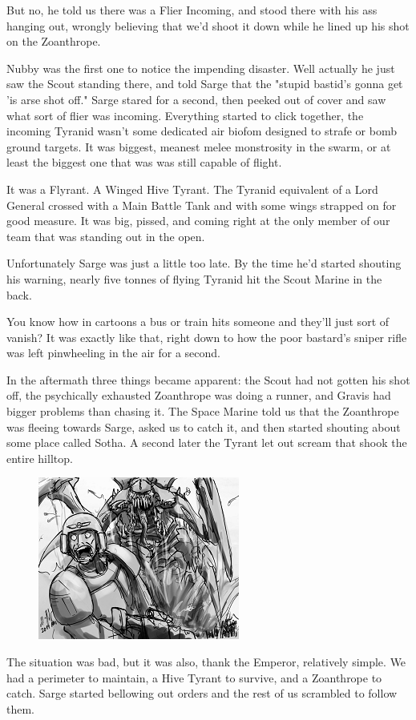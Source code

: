 But no, he told us there was a Flier Incoming, and stood there with his ass hanging out, wrongly believing that we'd shoot it down while he lined up his shot on the Zoanthrope.

Nubby was the first one to notice the impending disaster. 
Well actually he just saw the Scout standing there, and told Sarge that the "stupid bastid's gonna get 'is arse shot off." Sarge stared for a second, then peeked out of cover and saw what sort of flier was incoming. 
Everything started to click together, the incoming Tyranid wasn't some dedicated air biofom designed to strafe or bomb ground targets. 
It was biggest, meanest melee monstrosity in the swarm, or at least the biggest one that was was still capable of flight. 


It was a Flyrant. 
A Winged Hive Tyrant. 
The Tyranid equivalent of a Lord General crossed with a Main Battle Tank and with some wings strapped on for good measure. 
It was big, pissed, and coming right at the only member of our team that was standing out in the open.

Unfortunately Sarge was just a little too late. 
By the time he'd started shouting his warning, nearly five tonnes of flying Tyranid hit the Scout Marine in the back. 


You know how in cartoons a bus or train hits someone and they'll just sort of vanish? 
It was exactly like that, right down to how the poor bastard's sniper rifle was left pinwheeling in the air for a second.

In the aftermath three things became apparent: 
the Scout had not gotten his shot off, the psychically exhausted Zoanthrope was doing a runner, and Gravis had bigger problems than chasing it. 
The Space Marine told us that the Zoanthrope was fleeing towards Sarge, asked us to catch it, and then started shouting about some place called Sotha. 
A second later the Tyrant let out scream that shook the entire hilltop.

\begin{figure}
	\begin{center}
		\includegraphics[width=\figwidth]{pics/12/47.png}
	\end{center}
\end{figure}
The situation was bad, but it was also, thank the Emperor, relatively simple. 
We had a perimeter to maintain, a Hive Tyrant to survive, and a Zoanthrope to catch. 
Sarge started bellowing out orders and the rest of us scrambled to follow them.

